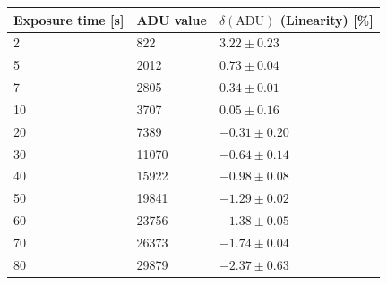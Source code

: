 \documentclass[../main.tex]{subfiles}
\begin{document}
 	\newpage
 	\begin{table}[]
 		\centering
 		\begin{tabular}{|l|l|l|}
 			\hline
 			\rowcolor[HTML]{C0C0C0} 
 			{\color[HTML]{000000} \textbf{Exposure time {[}s{]}}} & {\color[HTML]{000000} \textbf{ADU value}} & {\color[HTML]{000000} \textbf{$\delta(\text{ADU})$ (Linearity) {[}\%{]}}} \\ \hline
 			2                                                     & 822                                 & $3.22 \pm 0.23$                                    \\ \hline
 			5                                                     & 2012                                & $0.73 \pm 0.04$                                    \\ \hline
 			7                                                     & 2805                                & $0.34 \pm 0.01$                                    \\ \hline
 			10                                                    & 3707                                & $0.05 \pm 0.16$                                    \\ \hline
 			20                                                    & 7389                                & $-0.31 \pm 0.20$                                   \\ \hline
 			30                                                    & 11070                               & $-0.64 \pm 0.14$                                   \\ \hline
 			40                                                    & 15922                               & $-0.98 \pm 0.08$                                   \\ \hline
 			50                                                    & 19841                               & $-1.29 \pm 0.02$                                   \\ \hline
 			60                                                    & 23756                               & $-1.38 \pm 0.05$                                   \\ \hline
 			70                                                    & 26373                               & $-1.74 \pm 0.04$                                   \\ \hline
 			80                                                    & 29879                               & $-2.37\pm 0.63$                                    \\ \hline

\end{tabular}
\end{table}
\end{document}
